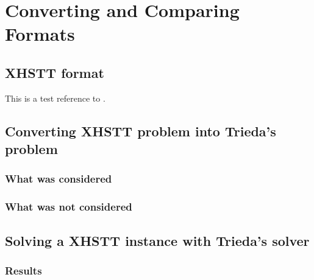 \chapter{Converting and Comparing Formats}
\label{chap:converting}



\section{XHSTT format}

This is a test reference to \cite{Hstt}.				  %




\section{Converting XHSTT problem into Trieda's problem}

\subsection{What was considered}

\subsection{What was not considered}



\section{Solving a XHSTT instance with Trieda's solver}

\subsection{Results}



